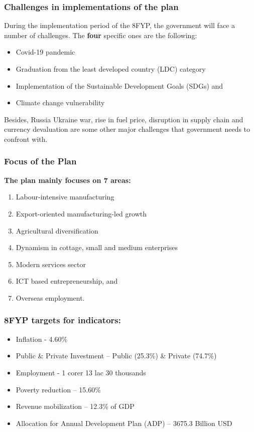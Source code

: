 \subsubsection{Challenges in implementations of the plan}
During the implementation period of the 8FYP, the government will face a
number of challenges. The \textbf{four} specific ones are the following:
\begin{itemize}
	\item Covid-19 pandemic
	\item Graduation from the least developed country (LDC) category
	\item Implementation of the Sustainable Development Goals (SDGs) and
	\item Climate change vulnerability
\end{itemize}
Besides, Russia Ukraine war, rise in fuel price, disruption in supply chain
and currency devaluation are some other major challenges that government
needs to confront with.

\subsubsection{Focus of the Plan}
\textbf{The plan mainly focuses on 7 areas:}
\begin{enumerate}
	\item Labour-intensive manufacturing
	\item Export-oriented manufacturing-led growth
	\item Agricultural diversification
	\item Dynamism in cottage, small and medium enterprises
	\item Modern services sector
	\item ICT based entrepreneurship, and
	\item Overseas employment.
\end{enumerate}

\subsubsection{8FYP targets for indicators:}
\begin{itemize}
	\item Inflation - 4.60\%
	\item Public \& Private Investment – Public (25.3\%) \& Private (74.7\%)
	\item Employment - 1 corer 13 lac 30 thousands
	\item Poverty reduction – 15.60\%
	\item Revenue mobilization – 12.3\% of GDP
	\item Allocation for Annual Development Plan (ADP) – 3675.3 Billion USD
\end{itemize}

